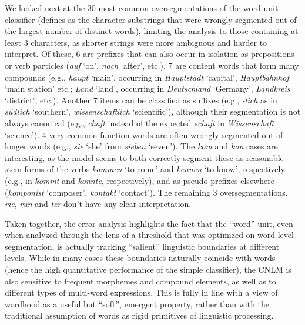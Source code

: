 We looked next at the 30 most common oversegmentations of the
word-unit classifier (defines as the character substrings that were
wrongly segmented out of the largest number of distinct words),
limiting the analysis to those containing at least 3 characters, as
shorter strings were more ambiguous and harder to interpret. Of these,
6 are prefixes that can also occur in isolation as prepositions or
verb particles (\emph{auf} `on', \emph{nach} `after', etc.). 7 are
content words that form many compounds (e.g., \emph{haupt} `main',
occurring in \emph{Hauptstadt} `capital', \emph{Hauptbahnhof} `main
station' etc.; \emph{Land} `land', occurring in \emph{Deutschland}
`Germany', \emph{Landkreis} `district', etc.). Another 7 items can be
classified as suffixes (e.g., \emph{-lich} as in \emph{s\"udlich}
`southern', \emph{wissenschaftlich} `scientific'), although their
segmentation is not always canonical (e.g., \emph{chaft} instead of
the expected \emph{schaft} in \emph{Wissenschaft} `science'). 4 very
common function words are often wrongly segmented out of longer words
(e.g., \emph{sie} `she' from \emph{sieben} `seven'). The \emph{kom}
and \emph{kon} cases are interesting, as the model seems to both
correctly segment these as reasonable stem forms of the verbs
\emph{kommen} `to come' and \emph{kennen} `to know', respectively
(e.g., in \emph{kommt} and \emph{konnte}, respectively), and as
pseudo-prefixes elsewhere (\emph{komponist} `composer', \emph{kontakt}
`contact'). The remaining 3 oversegmentations, \emph{rie}, \emph{run}
and \emph{ter} don't have any clear interpretation.

Taken together, the error analysis highlights the fact that the
``word'' unit, even when analyzed through the lens of a threshold that
was optimized on word-level segmentation, is actually tracking
``salient'' linguistic boundaries at different levels. While in many
cases these boundaries naturally coincide with words (hence the high
quantitative performance of the simple classifier), the CNLM is also
sensitive to frequent morphemes and compound elements, as well as to
different types of multi-word expressions. This is fully in line with
a view of wordhood as a useful but ``soft'', emergent property, rather
than with the traditional assumption of words as rigid primitives of
linguistic processing.










